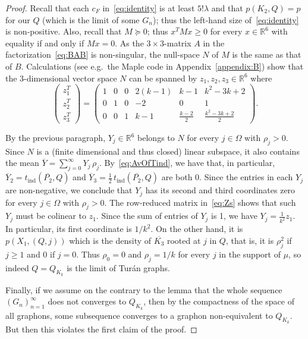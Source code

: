 \documentclass[12pt]{article}
\theoremstyle{definition}
\theoremstyle{remark}
\renewcommand{\O}[1]{\overline{#1}}
\newcommand{\tind}{t_{\mathrm{ind}}}
\newcommand{\I}[1]{{\mathbb #1}}
\newcommand{\V}[1]{{#1}}
\renewcommand{\ge}{\geqslant}
\renewcommand{\succeq}{\succcurlyeq}
\begin{document}
\begin{proof}
Recall that each $c_F$ in~\eqref{eq:identity} is at least $5!\lambda$ and that $p(K_2,Q)=p$ for our $Q$ (which is the limit of some $G_n$); thus the left-hand size of~\eqref{eq:identity} is non-positive. Also, recall that $M\succeq0$; thus $x^TMx\ge 0$ for every $x\in\I R^6$ with equality if and only if $Mx=0$. As the $3\times 3$-matrix $A$ in the factorization~\eqref{eq:BAB} is non-singular, the null-space $N$ of $M$ is the same as that of $B$. Calculations (see e.g.\ the Maple code in Appendix~\ref{appendix:B}) show that the 3-dimensional vector space $N$ can be spanned by $\V z_1,\V z_2,\V z_3\in\I R^6$ where
	\begin{equation}\label{eq:Zs}
	\left(\begin{array}{c}\V z_1^T\\ \V z_2^T\\ \V z_3^T
	\end{array}\right)
	= \left(
	\begin{array}{cccccc}
	1 & 0 & 0 & 2 (k-1) & k-1 & k^2-3 k+2 \\
	0 & 1 & 0 & -2 & 0 & 1 \\
	0 & 0 & 1 & k-1 & \frac{k-2}2 & \frac{k^2-3 k+2}2 
	\end{array}
	\right).
	\end{equation}
	 
	 By the previous paragraph, $Y_j\in\I R^6$ belongs to $N$ for every $j\in\Omega$ with $\rho_j>0$. 
	 Since $N$ is a (finite dimensional and thus closed) linear subspace, it also contains the mean $\O{Y}=\sum_{j=0}^\infty Y_j\, \rho_j$. By~\eqref{eq:AvOfTind}, we have that, in particular, $\O{Y}_2=\tind(\O{P_2},Q)$
	and $\O{Y}_3=\frac12\,\tind(\O{P_2},Q)$ are both 0. Since the entries in each $Y_j$ are non-negative,
	we conclude that 
 $Y_j$ has its second and third coordinates zero for every $j\in\Omega$ with $\rho_j>0$.
	The row-reduced matrix in~\eqref{eq:Zs} shows that such $Y_j$ must be colinear to $\V z_1$.
	Since the sum of entries of $Y_j$ is 1, we have $Y_j=\frac1{k^2}\V z_1$. In particular, its first coordinate is $1/k^2$. On the other hand, it is $p(X_1,(Q,j))$ which is the density of $\O{K_3}$ rooted at $j$ in $Q$, that is, it is $\rho_j^2$ if $j\ge 1$ and 0 if $j=0$. Thus $\rho_0=0$ and $\rho_j=1/k$ for every $j$ in the support of $\mu$, so indeed $Q=Q_{K_k}$ is the limit of Tur\'an graphs.


Finally, if we assume  on the contrary to the lemma that  the whole sequence $(G_n)_{n=1}^\infty$ does not converges to $Q_{K_k}$, then by the compactness of the space of all graphons, some subsequence converges to a graphon non-equivalent to $Q_{K_k}$. But then this violates the first claim of the proof.\end{proof}
\end{document}
